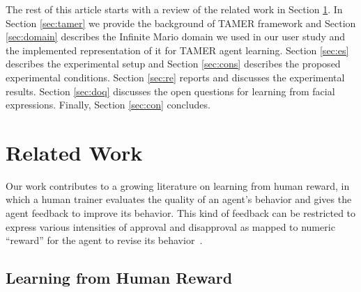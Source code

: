 \documentclass[10pt,journal,compsoc]{IEEEtran}
\begin{document}
The rest of this article starts with a review of the related work in Section \ref{sec:rw}. In Section \ref{sec:tamer} we provide the background of TAMER framework and Section \ref{sec:domain} describes the Infinite Mario domain we used in our user study and the implemented representation of it for TAMER agent learning. Section \ref{sec:es} describes the experimental setup and Section \ref{sec:cons} describes the proposed experimental conditions. Section \ref{sec:re} reports and discusses the experimental results. Section \ref{sec:doq} discusses the open questions for learning from facial expressions. Finally, Section \ref{sec:con} concludes. %

\section{Related Work}
\label{sec:rw}

Our work contributes to a growing literature on learning from human reward, in which a human trainer evaluates the quality of an agent's behavior and gives the agent feedback to improve its behavior. This kind of feedback can be restricted to express various intensities of approval and disapproval as mapped to numeric ``reward'' for the agent to revise its behavior~\cite{isbell2001social,knox2009interactively,tenorio2010dynamic,pilarski2011online,suay2011effect}. %

\subsection{Learning from Human Reward}
\end{document}

